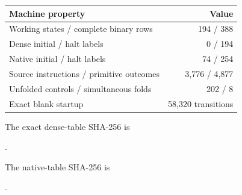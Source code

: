 \begin{center}
\begin{tabular}{@{}lr@{}}\toprule
Machine property & Value\\\midrule
Working states / complete binary rows & 194 / 388\\
Dense initial / halt labels & 0 / 194\\
Native initial / halt labels & 74 / 254\\
Source instructions / primitive outcomes & 3,776 / 4,877\\
Unfolded controls / simultaneous folds & 202 / 8\\
Exact blank startup & 58,320 transitions\\\bottomrule
\end{tabular}
\end{center}
The exact dense-table SHA-256 is
\begin{center}\small{}.\end{center}
The native-table SHA-256 is
\begin{center}\small{}.\end{center}

